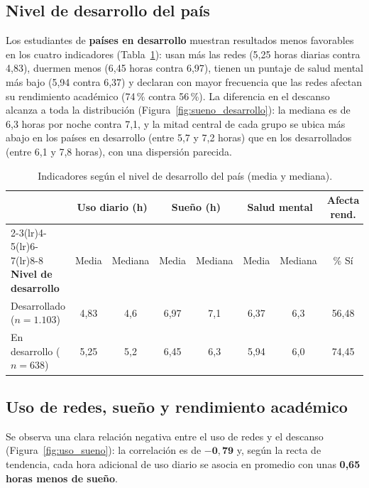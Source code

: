 \documentclass[10pt,a4paper]{article}
\begin{document}
\subsection{Nivel de desarrollo del país}

Los estudiantes de \textbf{países en desarrollo} muestran resultados menos favorables en los cuatro
indicadores (Tabla~\ref{tab:desarrollo}): usan más las redes (5,25 horas diarias contra 4,83), duermen
menos (6,45 horas contra 6,97), tienen un puntaje de salud mental más bajo (5,94 contra 6,37) y declaran con
mayor frecuencia que las redes afectan su rendimiento académico (74\,\% contra 56\,\%). La diferencia en el
descanso alcanza a toda la distribución (Figura~\ref{fig:sueno_desarrollo}): la mediana es de 6,3 horas
por noche contra 7,1, y la mitad central de cada grupo se ubica más abajo en los países en desarrollo
(entre 5,7 y 7,2 horas) que en los desarrollados (entre 6,1 y 7,8 horas), con una dispersión parecida.

\begin{table}[H]
\centering
\small
\caption{Indicadores según el nivel de desarrollo del país (media y mediana).}
\label{tab:desarrollo}
\begin{tabular}{l cc cc cc c}
\toprule
& \multicolumn{2}{c}{\textbf{Uso diario (h)}} & \multicolumn{2}{c}{\textbf{Sueño (h)}}
& \multicolumn{2}{c}{\textbf{Salud mental}} & \textbf{Afecta rend.} \\
\cmidrule(lr){2-3}\cmidrule(lr){4-5}\cmidrule(lr){6-7}\cmidrule(lr){8-8}
\textbf{Nivel de desarrollo} & Media & Mediana & Media & Mediana & Media & Mediana & \% Sí \\
\midrule
Desarrollado ($n=1.103$)  & 4,83 & 4,6 & 6,97 & 7,1 & 6,37 & 6,3 & 56,48 \\
En desarrollo ($n=638$)   & 5,25 & 5,2 & 6,45 & 6,3 & 5,94 & 6,0 & 74,45 \\
\bottomrule
\end{tabular}
\end{table}

\subsection{Uso de redes, sueño y rendimiento académico}

Se observa una clara relación negativa entre el uso de redes y el descanso (Figura~\ref{fig:uso_sueno}):
la correlación es de $\mathbf{-0{,}79}$ y, según la recta de tendencia, cada hora adicional de uso diario se
asocia en promedio con unas \textbf{0,65 horas menos de sueño}.
\end{document}
